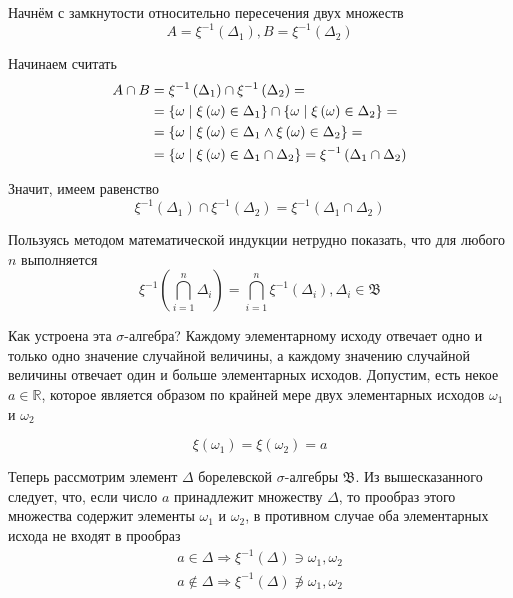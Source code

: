 \begin{enumerate}
      Начнём с замкнутости относительно пересечения двух множеств
      $$A=\xi^{-1}\left( \Delta_1 \right), B=\xi^{-1}\left( \Delta_2 \right)$$

      Начинаем считать
      \begin{align*}
      A \cap B
          &=\xi^{-1}\left( \Delta_1 \right)
        \cap \xi^{-1}\left( \Delta_2 \right) =\\
          &=\left\{ \omega \;\middle|\; \xi\left( \omega \right)
        \in \Delta_1 \right\}
        \cap \left\{ \omega \;\middle|\; \xi\left( \omega \right)
            \in \Delta_2 \right\} =\\
          &=\left\{ \omega \;\middle|\; \xi\left( \omega \right) \in \Delta_1
        \wedge \xi\left( \omega \right) \in \Delta_2 \right\} =\\
          &=\left\{ \omega \;\middle|\; \xi\left( \omega \right)
        \in \Delta_1 \cap \Delta_2 \right\}
          =\xi^{-1}\left( \Delta_1 \cap \Delta_2 \right)
      \end{align*}

      Значит, имеем равенство
      $$\xi^{-1}\left( \Delta_1 \right) \cap \xi^{-1}\left( \Delta_2 \right)
      =\xi^{-1}\left( \Delta_1 \cap \Delta_2 \right)$$

      Пользуясь методом математической индукции нетрудно показать,
      что для любого $n$ выполняется
      $$\xi^{-1}\left( \bigcap_{i=1}^n \Delta_i  \right)
      =\bigcap_{i=1}^n \xi^{-1}\left( \Delta_i \right),
          \Delta_i \in \mathfrak{B}$$
\end{enumerate}

Как устроена эта $\sigma$-алгебра?
Каждому элементарному исходу отвечает одно и только одно значение
случайной величины, а каждому значению случайной величины
отвечает один и больше элементарных исходов.
Допустим, есть некое $a\in\mathbb{R}$, которое является образом по крайней мере
двух элементарных исходов $\omega_1$ и $\omega_2$

$$\xi\left( \omega_1 \right) = \xi\left( \omega_2 \right) = a$$

Теперь рассмотрим элемент $\Delta$ борелевской $\sigma$-алгебры $\mathfrak{B}$.
Из вышесказанного следует, что,
если число $a$ принадлежит множеству $\Delta$, то прообраз этого множества
содержит элементы $\omega_1$ и $\omega_2$,
в противном случае оба элементарных исхода не входят в прообраз
\begin{align*}
  a \in \Delta
      \Rightarrow \xi^{-1}\left( \Delta \right) \ni \omega_1, \omega_2 \\
  a \notin \Delta
      \Rightarrow \xi^{-1}\left( \Delta \right) \not\ni \omega_1, \omega_2 \\
\end{align*}

